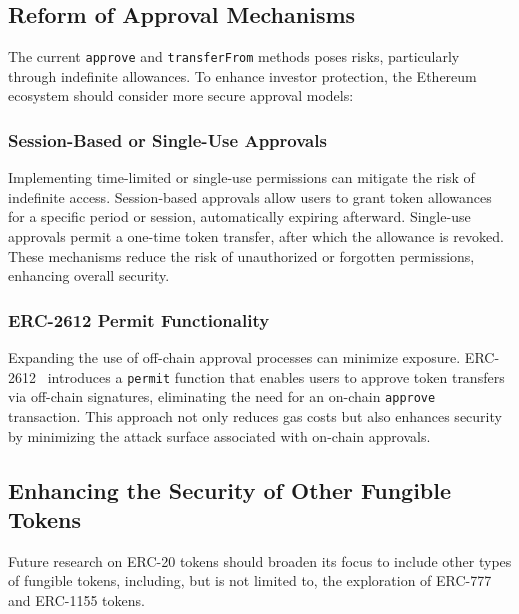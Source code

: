 \subsection{Reform of Approval Mechanisms}
The current \texttt{approve} and \texttt{transferFrom} methods poses risks, particularly through indefinite allowances. To enhance investor protection, the Ethereum ecosystem should consider more secure approval models:

\subsubsection{Session-Based or Single-Use Approvals}
Implementing time-limited or single-use permissions can mitigate the risk of indefinite access. Session-based approvals allow users to grant token allowances for a specific period or session, automatically expiring afterward. Single-use approvals permit a one-time token transfer, after which the allowance is revoked. These mechanisms reduce the risk of unauthorized or forgotten permissions, enhancing overall security.

\subsubsection{ERC-2612 Permit Functionality}
Expanding the use of off-chain approval processes can minimize exposure. ERC-2612~\cite{eip2612} introduces a \texttt{permit} function that enables users to approve token transfers via off-chain signatures, eliminating the need for an on-chain \texttt{approve} transaction. This approach not only reduces gas costs but also enhances security by minimizing the attack surface associated with on-chain approvals.

\subsection{Enhancing the Security of Other Fungible Tokens}
Future research on ERC-20 tokens should broaden its focus to include other types of fungible tokens, including, but is not limited to, the exploration of ERC-777 and ERC-1155 tokens.


